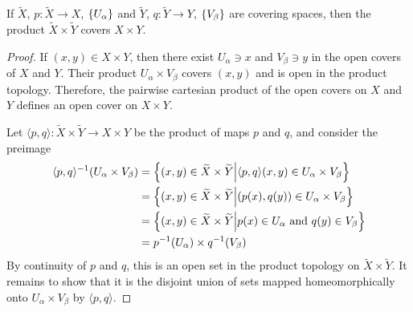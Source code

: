 \documentclass[a5paper]{article}
\newcommand{\wt}{\widetilde}
\begin{document}
\begin{proposition*}
	If $\tilde{X}$, $p:\tilde{X}\to X$, $\left\{U_\alpha\right\}$ and $\tilde{Y}$,
  $q:\tilde{Y}\to Y$, $\left\{V_\beta\right\}$ are covering spaces, then the product
  $\tilde{X}\times\tilde{Y}$ covers $X\times Y$.
\end{proposition*}
\begin{proof}
  If $(x,y)\in X\times Y$, then there exist $U_\alpha\ni x$ and $V_\beta\ni y$
  in the open covers of $X$ and $Y$. Their product $U_\alpha\times V_\beta$
  covers $(x,y)$ and is open in the product topology. Therefore, the pairwise
  cartesian product of the open covers on $X$ and $Y$ defines an open cover on
  $X\times Y$.

  Let $\langle p,q \rangle:\widetilde{X}\times \widetilde{Y}\to X\times Y$ be
  the product of maps $p$ and $q$, and consider the preimage
  \begin{align*}
    \langle p,q \rangle^{-1}(U_\alpha\times V_\beta)
    &= \braces{(x,y)\in \wt{X}\times\wt{Y}\Big|\langle p,q \rangle(x,y)\in U_\alpha\times V_\beta} \\
    &= \braces{(x,y)\in \wt{X}\times\wt{Y}\Big|(p(x),q(y))\in U_\alpha\times V_\beta} \\
    &= \braces{(x,y)\in \wt{X}\times\wt{Y}\Big|p(x)\in U_\alpha\text{ and }q(y)\in V_\beta} \\
    &= p^{-1}(U_\alpha)\times q^{-1}(V_\beta)
  \end{align*}
  By continuity of $p$ and $q$, this is an open set in the product topology on
  $\wt{X}\times \wt{Y}$.
  It remains to show that it is the disjoint union of sets
  mapped homeomorphically onto $U_\alpha\times V_\beta$ by $\langle p,q \rangle$.

\end{proof}
\end{document}
